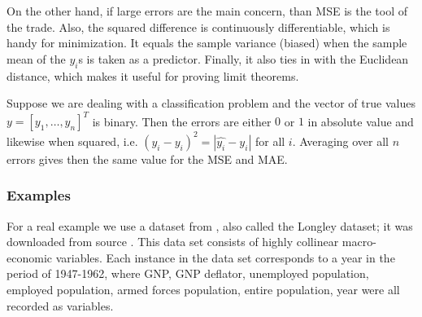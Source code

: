 \documentclass{llncs}
\begin{document}
On the other hand, if large errors are the main concern, than MSE is the tool of the trade. Also, the squared difference is continuously differentiable, which is handy for minimization. It equals the sample variance (biased) when the sample mean of the $y_{i}$s is taken as a predictor. Finally, it also ties in with the Euclidean distance, which makes it useful for proving limit theorems.

Suppose we are dealing with a classification problem and the vector of true values $y=[y_{1},\dots,y_{n}]^{T}$ is binary. Then the errors are either $0$ or $1$ in absolute value and likewise when squared, i.e. $(\hat{y_{i}} - y_{i})^{2}=|\hat{y_{i}}-y_{i}|$ for all $i$. Averaging over all $n$ errors gives then the same value for the MSE and MAE.

\subsubsection{Examples}
For a real example we use a dataset from \cite{Longl}, also called the Longley dataset; it was downloaded from source \cite{WinNT}. This data set consists of highly collinear macro-economic variables. Each instance in the data set corresponds to a year in the period of 1947-1962, where GNP, GNP deflator, unemployed population, employed population, armed forces population, entire population, year were all recorded as variables.

\end{document}

